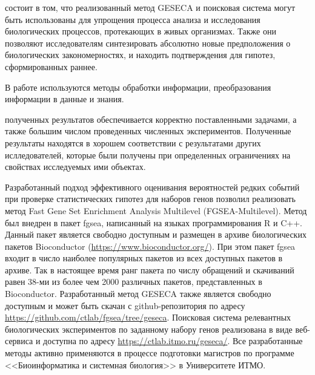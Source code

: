 {\influence} состоит в том, что реализованный метод GESECA и поисковая система могут быть использованы для упрощения процесса анализа и исследования биологических процессов, протекающих в живых организмах. 
Также они позволяют исследователям синтезировать абсолютно новые предположения о биологических закономерностях, и находить подтверждения для гипотез, сформированных раннее. 

{\methods} В работе используются методы обработки информации, преобразования информации в данные и знания.


{\reliability} полученных результатов обеспечивается корректно поставленными задачами, а также большим числом проведенных численных экспериментов.
Полученные результаты находятся в хорошем соответствии с результатами других ислледователей, которые были получены при определенных ограничениях на свойствах исследуемых ими объектах.

{\integration} Разработанный подход эффективного оценивания вероятностей редких событий при проверке статистических гипотез для наборов генов позволил реализовать метод Fast Gene Set Enrichment Analysis Multilevel (FGSEA-Multilevel).
Метод был внедрен в пакет fgsea, написанный на языках программирования R и C++. 
Данный пакет является свободно доступным и размещен в архиве биологических пакетов Bioconductor (\url{https://www.bioconductor.org/}).
При этом пакет fgsea входит в число наиболее популярных пакетов из всех доступных пакетов в архиве.
Так в настоящее время ранг пакета по числу обращений и скачиваний равен 38-ми из более чем 2000 различных пакетов, представленных в Bioconductor.
Разработанный метод GESECA также является свободно доступным и может быть скачан с github-репозитория по адресу \url{https://github.com/ctlab/fgsea/tree/geseca}. Поисковая система релевантных биологических экспериментов по заданному набору генов реализована в виде веб-сервиса и доступна по адресу \url{https://ctlab.itmo.ru/geseca/}. Все разработанные методы активно применяются в процессе подготовки магистров по программе <<Биоинформатика и системная биология>> в Университете ИТМО.


